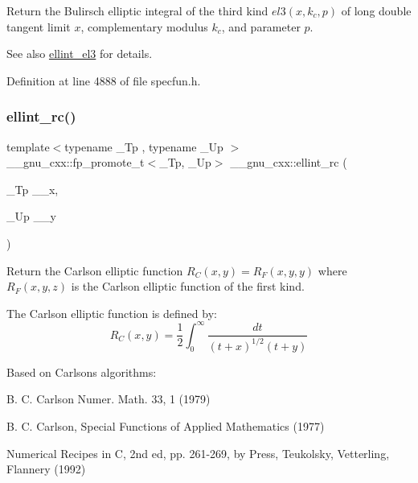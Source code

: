 Return the Bulirsch elliptic integral of the third kind $ el3(x,k_c,p) $ of {\ttfamily long double} tangent limit $ x $, complementary modulus $ k_c $, and parameter $ p $.

\begin{DoxySeeAlso}{See also}
\hyperlink{group__gnu__math__spec__func_gaac07922e08fdf46cd509ff0cfa9ea1f0}{ellint\+\_\+el3} for details. 
\end{DoxySeeAlso}


Definition at line 4888 of file specfun.\+h.

\mbox{\label{group__gnu__math__spec__func_ga7d3d42f5f71a74266be8aaca528056bf}} 
\subsubsection{\texorpdfstring{ellint\+\_\+rc()}{ellint\_rc()}}
{\footnotesize\ttfamily template$<$typename \+\_\+\+Tp , typename \+\_\+\+Up $>$ \\
\+\_\+\+\_\+gnu\+\_\+cxx\+::fp\+\_\+promote\+\_\+t$<$\+\_\+\+Tp, \+\_\+\+Up$>$ \+\_\+\+\_\+gnu\+\_\+cxx\+::ellint\+\_\+rc (\begin{DoxyParamCaption}\item[{\+\_\+\+Tp}]{\+\_\+\+\_\+x,  }\item[{\+\_\+\+Up}]{\+\_\+\+\_\+y }\end{DoxyParamCaption})\hspace{0.3cm}{\ttfamily [inline]}}

Return the Carlson elliptic function $ R_C(x,y) = R_F(x,y,y) $ where $ R_F(x,y,z) $ is the Carlson elliptic function of the first kind.

The Carlson elliptic function is defined by\+: \[ R_C(x,y) = \frac{1}{2} \int_0^\infty \frac{dt}{(t + x)^{1/2}(t + y)} \]

Based on Carlson\textquotesingle{}s algorithms\+:
\begin{DoxyItemize}
\item B. C. Carlson Numer. Math. 33, 1 (1979)
\item B. C. Carlson, Special Functions of Applied Mathematics (1977)
\item Numerical Recipes in C, 2nd ed, pp. 261-\/269, by Press, Teukolsky, Vetterling, Flannery (1992)
\end{DoxyItemize}


